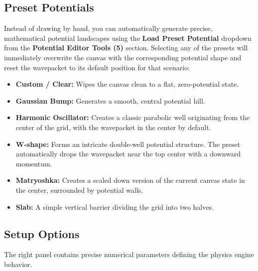\documentclass[11pt, a4paper]{article}
\begin{document}
\subsection{Preset Potentials}
Instead of drawing by hand, you can automatically generate precise, mathematical potential landscapes using the \textbf{Load Preset Potential} dropdown from the \textbf{Potential Editor Tools (5)} section. Selecting any of the presets will immediately overwrite the canvas with the corresponding potential shape and reset the wavepacket to its default position for that scenario:
\begin{itemize}
    \item \textbf{Custom / Clear:} Wipes the canvas clean to a flat, zero-potential state.
    \item \textbf{Gaussian Bump:} Generates a smooth, central potential hill.
    \item \textbf{Harmonic Oscillator:} Creates a classic parabolic well originating from the center of the grid, with the wavepacket in the center by default.
    \item \textbf{W-shape:} Forms an intricate double-well potential structure. The preset automatically drops the wavepacket near the top center with a downward momentum.
    \item \textbf{Matryoshka:} Creates a scaled down version of the current canvas state in the center, surrounded by potential walls.
    \item \textbf{Slab:} A simple vertical barrier dividing the grid into two halves.
\end{itemize}

\subsection{Setup Options}
The right panel contains precise numerical parameters defining the physics engine behavior.
\end{document}
